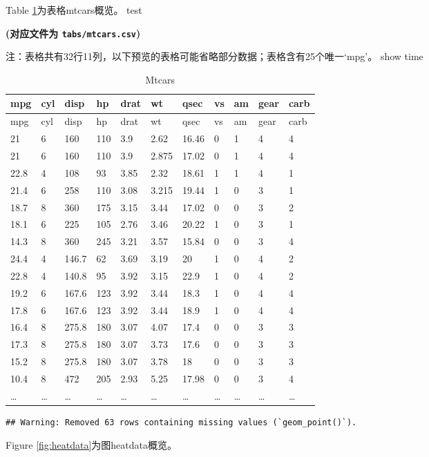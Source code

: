 \documentclass[
]{article}
\begin{document}
Table \ref{tab:mtcars}为表格mtcars概览。
test

\textbf{(对应文件为 \texttt{tabs/mtcars.csv})}

\begin{center}\begin{tcolorbox}[colback=gray!10, colframe=gray!50, width=0.9\linewidth, arc=1mm, boxrule=0.5pt]注：表格共有32行11列，以下预览的表格可能省略部分数据；表格含有25个唯一`mpg'。
show time\end{tcolorbox}
\end{center}

\begin{longtable}[]{@{}lllllllllll@{}}
\caption{\label{tab:mtcars}Mtcars}\tabularnewline
\toprule
mpg & cyl & disp & hp & drat & wt & qsec & vs & am & gear & carb\tabularnewline
\midrule
\endfirsthead
\toprule
mpg & cyl & disp & hp & drat & wt & qsec & vs & am & gear & carb\tabularnewline
\midrule
\endhead
21 & 6 & 160 & 110 & 3.9 & 2.62 & 16.46 & 0 & 1 & 4 & 4\tabularnewline
21 & 6 & 160 & 110 & 3.9 & 2.875 & 17.02 & 0 & 1 & 4 & 4\tabularnewline
22.8 & 4 & 108 & 93 & 3.85 & 2.32 & 18.61 & 1 & 1 & 4 & 1\tabularnewline
21.4 & 6 & 258 & 110 & 3.08 & 3.215 & 19.44 & 1 & 0 & 3 & 1\tabularnewline
18.7 & 8 & 360 & 175 & 3.15 & 3.44 & 17.02 & 0 & 0 & 3 & 2\tabularnewline
18.1 & 6 & 225 & 105 & 2.76 & 3.46 & 20.22 & 1 & 0 & 3 & 1\tabularnewline
14.3 & 8 & 360 & 245 & 3.21 & 3.57 & 15.84 & 0 & 0 & 3 & 4\tabularnewline
24.4 & 4 & 146.7 & 62 & 3.69 & 3.19 & 20 & 1 & 0 & 4 & 2\tabularnewline
22.8 & 4 & 140.8 & 95 & 3.92 & 3.15 & 22.9 & 1 & 0 & 4 & 2\tabularnewline
19.2 & 6 & 167.6 & 123 & 3.92 & 3.44 & 18.3 & 1 & 0 & 4 & 4\tabularnewline
17.8 & 6 & 167.6 & 123 & 3.92 & 3.44 & 18.9 & 1 & 0 & 4 & 4\tabularnewline
16.4 & 8 & 275.8 & 180 & 3.07 & 4.07 & 17.4 & 0 & 0 & 3 & 3\tabularnewline
17.3 & 8 & 275.8 & 180 & 3.07 & 3.73 & 17.6 & 0 & 0 & 3 & 3\tabularnewline
15.2 & 8 & 275.8 & 180 & 3.07 & 3.78 & 18 & 0 & 0 & 3 & 3\tabularnewline
10.4 & 8 & 472 & 205 & 2.93 & 5.25 & 17.98 & 0 & 0 & 3 & 4\tabularnewline
\ldots{} & \ldots{} & \ldots{} & \ldots{} & \ldots{} & \ldots{} & \ldots{} & \ldots{} & \ldots{} & \ldots{} & \ldots{}\tabularnewline
\bottomrule
\end{longtable}

\begin{verbatim}
## Warning: Removed 63 rows containing missing values (`geom_point()`).
\end{verbatim}

Figure \ref{fig:heatdata}为图heatdata概览。
\end{document}
